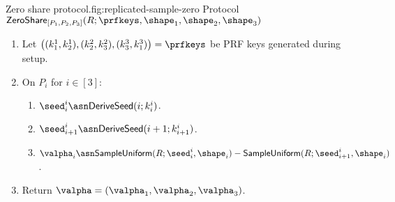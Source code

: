 \begin{Boxfig}{Zero share protocol.}{fig:replicated-sample-zero}
  {Protocol $\mathsf{ZeroShare}_{[P_1, P_2, P_3]}(R; \prfkeys, \shape_1, \shape_2, \shape_3)$}

  \begin{enumerate}
  \item Let $\left( (k_1^1, k_2^1), (k_2^2, k_3^2), (k_3^3, k_1^3) \right) = \prfkeys$ be PRF keys generated during setup.

  \item On $P_i$ for $i \in [3]$:
  \begin{enumerate}
    \item ${\seed}^i_i \asn \mathsf{DeriveSeed}(i; k^i_i)$.
    \item ${\seed}^i_{i+1} \asn \mathsf{DeriveSeed}(i + 1; k^i_{i+1})$.
    \item $\valpha_i \asn \mathsf{SampleUniform}(R; \seed^i_i, \shape_i) - \mathsf{SampleUniform}(R; \seed^i_{i+1}, \shape_i)$.
  \end{enumerate}

  \item Return $\valpha = \left( \valpha_1, \valpha_2, \valpha_3 \right)$.
  \end{enumerate}
\end{Boxfig}
